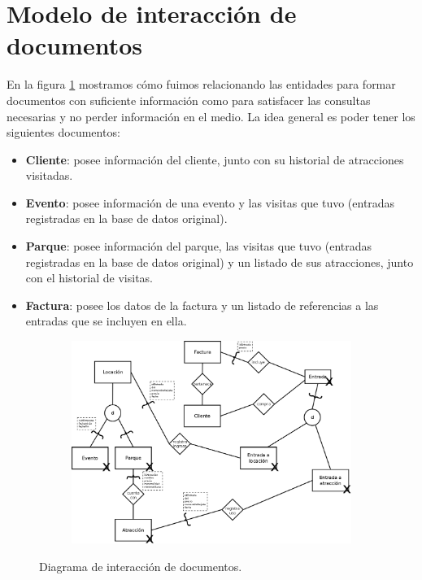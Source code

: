 \section{Modelo de interacción de documentos}

\par En la figura \ref{fig:did} mostramos cómo fuimos relacionando las entidades para formar documentos con suficiente información como para satisfacer las consultas necesarias y no perder información en el medio.
La idea general es poder tener los siguientes documentos:
\begin{itemize}
  \item \textbf{Cliente}: posee información del cliente, junto con su historial de atracciones visitadas.
  \item \textbf{Evento}: posee información de una evento y las visitas que tuvo (entradas registradas en la base de datos original).
  \item \textbf{Parque}: posee información del parque, las visitas que tuvo (entradas registradas en la base de datos original) y un listado de sus atracciones, junto con el historial de visitas.
  \item \textbf{Factura}: posee los datos de la factura y un listado de referencias a las entradas que se incluyen en ella.
\end{itemize}

\begin{figure}[ht]
  \hspace*{-1.5cm}
  \begin{subfigure}{1.2\textwidth}
    \includegraphics[width=\textwidth]{src/did.png}
  \end{subfigure}
  \caption{Diagrama de interacción de documentos.}
  \label{fig:did}
\end{figure}
